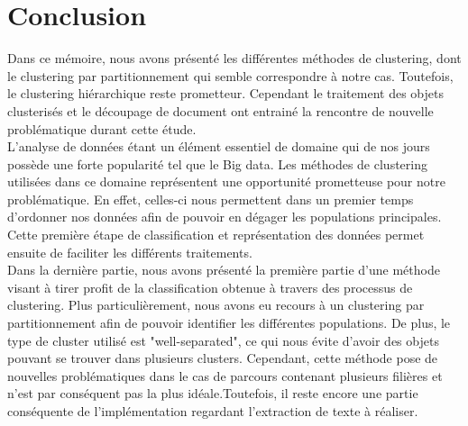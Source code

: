 \documentclass[memoire.tex]{subfiles}
\begin{document}
\section{Conclusion}
Dans ce mémoire, nous avons présenté les différentes méthodes de clustering, dont le clustering par partitionnement qui semble correspondre à notre cas. Toutefois, le clustering hiérarchique reste prometteur. Cependant le traitement des objets clusterisés et le découpage de document ont entrainé la rencontre de nouvelle problématique durant cette étude.\\
L'analyse de données étant un élément essentiel de domaine qui de nos jours possède une forte popularité tel que le Big data. Les méthodes de clustering utilisées dans ce domaine représentent une opportunité prometteuse pour notre problématique. En effet, celles-ci nous permettent dans un premier temps d'ordonner nos données afin de pouvoir en dégager les populations principales. Cette première étape de classification et représentation des données permet ensuite de faciliter les différents traitements.\\
Dans la dernière partie, nous avons présenté la première partie d'une méthode visant à tirer profit de la classification obtenue à travers des processus de clustering. Plus particulièrement, nous avons eu recours à un clustering par partitionnement afin de pouvoir identifier les différentes populations. De plus, le type de cluster utilisé est "well-separated", ce qui nous évite d'avoir des objets pouvant se trouver dans plusieurs clusters. Cependant, cette méthode pose de nouvelles problématiques dans le cas de parcours contenant plusieurs filières et n'est par conséquent pas la plus idéale.Toutefois, il reste encore une partie conséquente de l'implémentation regardant l'extraction de texte à réaliser.
\end{document}
